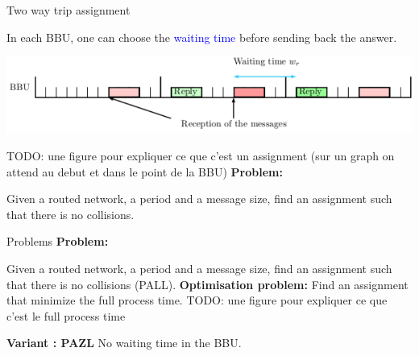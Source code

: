 \documentclass[10 pt]{beamer}
\newcommand{\todo}[1]{{\color{red} TODO: {#1}}}
\begin{document}
\begin{frame}{Two way trip assignment}
\begin{center}
{\begin{tikzpicture}
\end{tikzpicture}
}
\end{center}
\pause

In each BBU, one can choose the \textcolor{blue}{waiting time} before sending back the answer.\\

\begin{center}
  \includegraphics[scale=0.7]{BBU}\\
 \end{center} 

\pause
\todo{une figure pour expliquer ce que c'est un assignment (sur un graph on attend au debut et dans le point de la BBU)}
\textbf{Problem:}

Given a routed network, a period and a message size, find an assignment such that there is no collisions.
   
\end{frame}

\begin{frame}{Problems}
\textbf{Problem:}

Given a routed network, a period and a message size, find an assignment such that there is no collisions (PALL).
\textbf{Optimisation problem:}
Find an assignment that minimize the full process time.
\todo{une figure pour expliquer ce que c'est le full process time}

\textbf{Variant : PAZL}
No waiting time in the BBU.

\end{frame}
\end{document}
